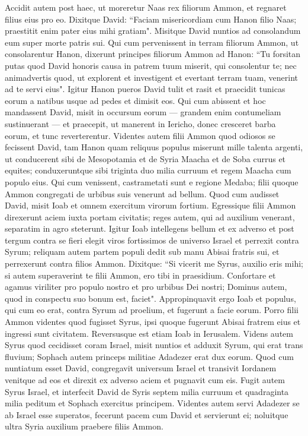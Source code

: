 \begin{biblechapter}  
\verse Accidit autem post haec, ut moreretur Naas rex filiorum Ammon, et regnaret filius eius pro eo. 
\verse Dixitque David: “Faciam misericordiam cum Hanon filio Naas; praestitit enim pater eius mihi gratiam". Misitque David nuntios ad consolandum eum super morte patris sui. Qui cum pervenissent in terram filiorum Ammon, ut consolarentur Hanon, 
\verse dixerunt principes filiorum Ammon ad Hanon: “Tu forsitan putas quod David honoris causa in patrem tuum miserit, qui consolentur te; nec animadvertis quod, ut explorent et investigent et evertant terram tuam, venerint ad te servi eius". 
\verse Igitur Hanon pueros David tulit et rasit et praecidit tunicas eorum a natibus usque ad pedes et dimisit eos. 
\verse Qui cum abissent et hoc mandassent David, misit in occursum eorum — grandem enim contumeliam sustinuerant — et praecepit, ut manerent in Iericho, donec cresceret barba eorum, et tunc reverterentur. 
\verse Videntes autem filii Ammon quod odiosos se fecissent David, tam Hanon quam reliquus populus miserunt mille talenta argenti, ut conducerent sibi de Mesopotamia et de Syria Maacha et de Soba currus et equites; 
\verse conduxeruntque sibi triginta duo milia curruum et regem Maacha cum populo eius. Qui cum venissent, castrametati sunt e regione Medaba; filii quoque Ammon congregati de urbibus suis venerunt ad bellum. 
\verse Quod cum audisset David, misit Ioab et omnem exercitum virorum fortium. 
\verse Egressique filii Ammon direxerunt aciem iuxta portam civitatis; reges autem, qui ad auxilium venerant, separatim in agro steterunt. 
\verse Igitur Ioab intellegens bellum et ex adverso et post tergum contra se fieri elegit viros fortissimos de universo Israel et perrexit contra Syrum; 
\verse reliquam autem partem populi dedit sub manu Abisai fratris sui, et perrexerunt contra filios Ammon. 
\verse Dixitque: “Si vicerit me Syrus, auxilio eris mihi; si autem superaverint te filii Ammon, ero tibi in praesidium. 
\verse Confortare et agamus viriliter pro populo nostro et pro urbibus Dei nostri; Dominus autem, quod in conspectu suo bonum est, faciet". 
\verse Appropinquavit ergo Ioab et populus, qui cum eo erat, contra Syrum ad proelium, et fugerunt a facie eorum. 
\verse Porro filii Ammon videntes quod fugisset Syrus, ipsi quoque fugerunt Abisai fratrem eius et ingressi sunt civitatem. Reversusque est etiam Ioab in Ierusalem. 
\verse Videns autem Syrus quod cecidisset coram Israel, misit nuntios et adduxit Syrum, qui erat trans fluvium; Sophach autem princeps militiae Adadezer erat dux eorum. 
\verse Quod cum nuntiatum esset David, congregavit universum Israel et transivit Iordanem venitque ad eos et direxit ex adverso aciem et pugnavit cum eis. 
\verse Fugit autem Syrus Israel, et interfecit David de Syris septem milia curruum et quadraginta milia peditum et Sophach exercitus principem. 
\verse Videntes autem servi Adadezer se ab Israel esse superatos, fecerunt pacem cum David et servierunt ei; noluitque ultra Syria auxilium praebere filiis Ammon. 
\end{biblechapter}


